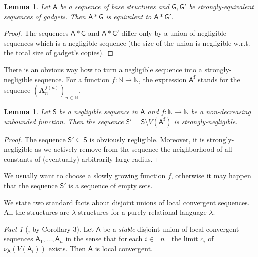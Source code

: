 \documentclass[11pt]{article}
\theoremstyle{plain}
\newtheorem{lemma}[theorem]{Lemma}
\theoremstyle{definition}
\theoremstyle{remark}
\newtheorem{fact}{Fact}
\newcommand{\N}{\mathbb{N}}
\newcommand{\str}[1]{\mathbf{#1}}
\newcommand{\strseq}[1]{{\boldsymbol{\mathsf{#1}}}}
\newcommand{\seq}[1]{{\mathsf{#1}}}
\begin{document}
\begin{lemma}\label{lem:negligible_sequences_and_equivalent_structures}
    Let $\strseq{A}$ be a sequence of base structures and $\strseq{G}, \strseq{G}'$ be strongly-equivalent sequences of gadgets.
    Then $\strseq{A}*\strseq{G}$ is equivalent to $\strseq{A}*\strseq{G}'$.
\end{lemma}
\begin{proof}
    The sequences $\strseq{A}*\strseq{G}$ and $\strseq{A}*\strseq{G}'$ differ only by a union of negligible sequences which is a negligible sequence (the size of the union is negligible w.r.t. the total size of gadget's copies).
\end{proof}

There is an obvious way how to turn a negligible sequence into a strongly-negligible sequence.
For a function $f: \N \to \N$, the expression $\strseq{A}^{\bm{f}}$ stands for the sequence $(\str{A}_n^{f(n)})_{n \in \N}$.

\begin{lemma}\label{lem:from_negligible_to_strongly_negligible}
    Let $\seq{S}$ be a negligible sequence in $\strseq{A}$ and $f: \N \to \N$ be a non-decreasing unbounded function.
    Then the sequence $\seq{S}' = \seq{S} \setminus V(\strseq{A}^{\bm{f}})$ is strongly-negligible.
\end{lemma}
\begin{proof}
    The sequence $\seq{S}' \subseteq \seq{S}$ is obviously negligible.
    Moreover, it is strongly-negligible as we actively remove from the sequence the neighborhood of all constants of (eventually) arbitrarily large radius.
\end{proof}

We usually want to choose a slowly growing function $f$, otherwise it may happen that the sequence $\seq{S}'$ is a sequence of empty sets.

We state two standard facts about disjoint unions of local convergent sequences.
All the structures are $\lambda$-structures for a purely relational language $\lambda$.

\begin{fact}[\cite{clustering}, by Corollary 3]\label{fact:union_of_convergent_sequences}
    Let $\strseq{A}$ be a \emph{stable} disjoint union of local convergent sequences $\strseq{A}_1, \dots, \strseq{A}_n$ in the sense that for each $i \in [n]$ the limit $c_i$ of $\nu_\strseq{A}(V(\strseq{A}_i))$ exists.
    Then $\strseq{A}$ is local convergent.
\end{fact}
\end{document}
